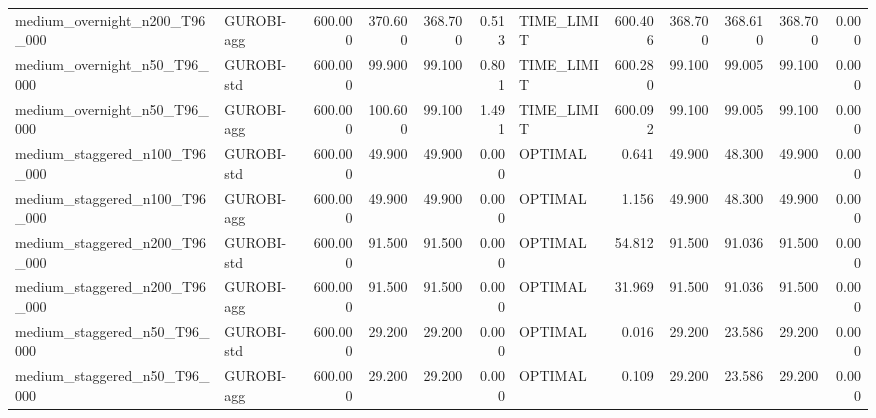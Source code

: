 \begin{table}[htbp]
\begin{tabular}{llrrrrlrrrrr}
medium\_overnight\_n200\_T96\_000 & GUROBI-agg & 600.000 & 370.600 & 368.700 & 0.513 & TIME\_LIMIT & 600.406 & 368.700 & 368.610 & 368.700 & 0.000 \\
medium\_overnight\_n50\_T96\_000 & GUROBI-std & 600.000 & 99.900 & 99.100 & 0.801 & TIME\_LIMIT & 600.280 & 99.100 & 99.005 & 99.100 & 0.000 \\
medium\_overnight\_n50\_T96\_000 & GUROBI-agg & 600.000 & 100.600 & 99.100 & 1.491 & TIME\_LIMIT & 600.092 & 99.100 & 99.005 & 99.100 & 0.000 \\
medium\_staggered\_n100\_T96\_000 & GUROBI-std & 600.000 & 49.900 & 49.900 & 0.000 & OPTIMAL & 0.641 & 49.900 & 48.300 & 49.900 & 0.000 \\
medium\_staggered\_n100\_T96\_000 & GUROBI-agg & 600.000 & 49.900 & 49.900 & 0.000 & OPTIMAL & 1.156 & 49.900 & 48.300 & 49.900 & 0.000 \\
medium\_staggered\_n200\_T96\_000 & GUROBI-std & 600.000 & 91.500 & 91.500 & 0.000 & OPTIMAL & 54.812 & 91.500 & 91.036 & 91.500 & 0.000 \\
medium\_staggered\_n200\_T96\_000 & GUROBI-agg & 600.000 & 91.500 & 91.500 & 0.000 & OPTIMAL & 31.969 & 91.500 & 91.036 & 91.500 & 0.000 \\
medium\_staggered\_n50\_T96\_000 & GUROBI-std & 600.000 & 29.200 & 29.200 & 0.000 & OPTIMAL & 0.016 & 29.200 & 23.586 & 29.200 & 0.000 \\
medium\_staggered\_n50\_T96\_000 & GUROBI-agg & 600.000 & 29.200 & 29.200 & 0.000 & OPTIMAL & 0.109 & 29.200 & 23.586 & 29.200 & 0.000 \\
\bottomrule
\end{tabular}
\end{table}
